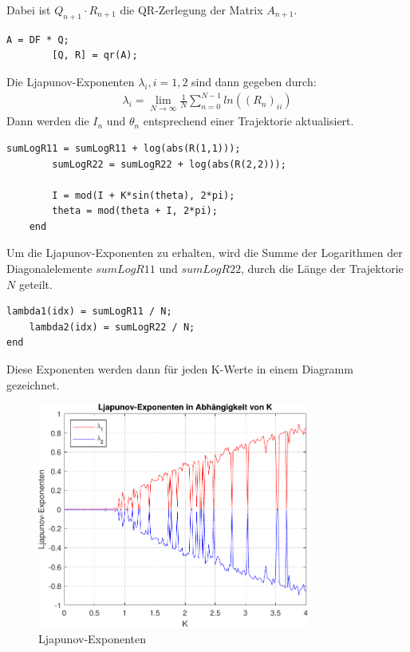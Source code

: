 \documentclass[paper=a4, 
                DIV=12]{scrartcl}
\begin{document}
Dabei ist $Q_{n+1} \cdot R_{n+1}$ die QR-Zerlegung der Matrix $A_{n+1}$.
\begin{lstlisting}[frame=single, style=Matlab-editor]
        A = DF * Q;
        [Q, R] = qr(A);
\end{lstlisting}
\newpage
Die Ljapunov-Exponenten $\lambda_i, i = 1,2$ sind dann gegeben durch:
\begin{gather*}
    \lambda_i = \lim_{N\to\infty}\frac{1}{N}\sum_{n=0}^{N-1}ln((R_n)_{ii})
\end{gather*}
Dann werden die $I_n$ und $\theta_n$ entsprechend einer Trajektorie aktualisiert.
\begin{lstlisting}[frame=single, style=Matlab-editor]
        sumLogR11 = sumLogR11 + log(abs(R(1,1)));
        sumLogR22 = sumLogR22 + log(abs(R(2,2)));

        I = mod(I + K*sin(theta), 2*pi);
        theta = mod(theta + I, 2*pi);
    end
\end{lstlisting}
Um die Ljapunov-Exponenten zu erhalten, wird die Summe der Logarithmen der Diagonalelemente $sumLogR11$ und $sumLogR22$, durch die Länge der Trajektorie $N$ geteilt. 
\begin{lstlisting}[frame=single, style=Matlab-editor]
    lambda1(idx) = sumLogR11 / N;
    lambda2(idx) = sumLogR22 / N;
end
\end{lstlisting}
Diese Exponenten werden dann für jeden K-Werte in einem Diagramm gezeichnet.
\begin{figure}[H]
    \centering
    \includegraphics[width=0.8\textwidth]{figures/exponenten.pdf}
    \caption{Ljapunov-Exponenten}
\end{figure}
\newpage
\end{document}
